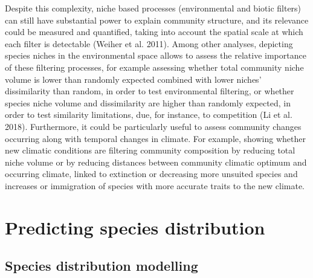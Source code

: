 \documentclass[11pt,twoside]{reedthesis}
\begin{document}
Despite this complexity, niche based processes (environmental and biotic
filters) can still have substantial power to explain community
structure, and its relevance could be measured and quantified, taking
into account the spatial scale at which each filter is detectable
(Weiher et al. 2011). Among other analyses, depicting species niches in
the environmental space allows to assess the relative importance of
these filtering processes, for example assessing whether total community
niche volume is lower than randomly expected combined with lower niches'
dissimilarity than random, in order to test environmental filtering, or
whether species niche volume and dissimilarity are higher than randomly
expected, in order to test similarity limitations, due, for instance, to
competition (Li et al. 2018). Furthermore, it could be particularly
useful to assess community changes occurring along with temporal changes
in climate. For example, showing whether new climatic conditions are
filtering community composition by reducing total niche volume or by
reducing distances between community climatic optimum and occurring
climate, linked to extinction or decreasing more unsuited species and
increases or immigration of species with more accurate traits to the new
climate.\par

\section{Predicting species
distribution}\label{predicting-species-distribution}

\subsection{Species distribution
modelling}\label{species-distribution-modelling}

\par
\end{document}
